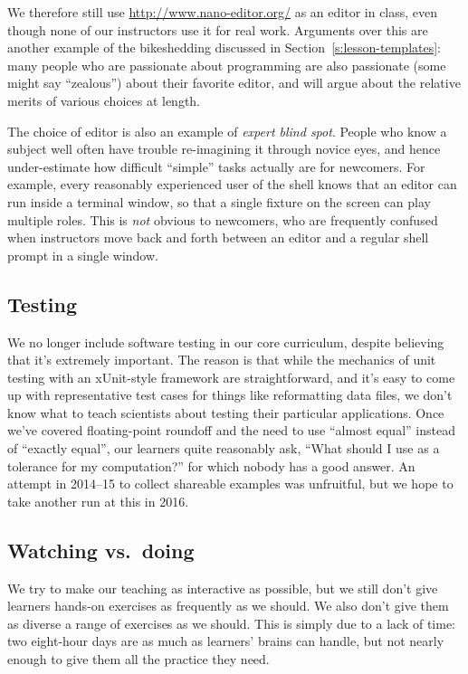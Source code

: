 \documentclass[10pt,a4paper,twocolumn]{article}
\begin{document}
We therefore still use \href{Nano}{http://www.nano-editor.org/} as an
editor in class, even though none of our instructors use it for real
work.  Arguments over this are another example of the bikeshedding
discussed in Section~\ref{s:lesson-templates}: many people who are
passionate about programming are also passionate (some might say
``zealous'') about their favorite editor, and will argue about the
relative merits of various choices at length.

The choice of editor is also an example of \emph{expert blind spot}.
People who know a subject well often have trouble re-imagining it
through novice eyes, and hence under-estimate how difficult ``simple''
tasks actually are for newcomers.  For example, every reasonably
experienced user of the shell knows that an editor can run inside a
terminal window, so that a single fixture on the screen can play
multiple roles.  This is \emph{not} obvious to newcomers, who are
frequently confused when instructors move back and forth between an
editor and a regular shell prompt in a single window.

\subsection{Testing}

We no longer include software testing in our core curriculum, despite
believing that it's extremely important.  The reason is that while the
mechanics of unit testing with an xUnit-style framework are
straightforward, and it's easy to come up with representative test
cases for things like reformatting data files, we don't know what to
teach scientists about testing their particular applications.  Once
we've covered floating-point roundoff and the need to use ``almost
equal'' instead of ``exactly equal'', our learners quite reasonably
ask, ``What should I use as a tolerance for my computation?'' for
which nobody has a good answer.  An attempt in 2014--15 to collect
shareable examples was unfruitful, but we hope to take another run at
this in 2016.

\subsection{Watching vs.\ doing}

We try to make our teaching as interactive as possible, but we still
don't give learners hands-on exercises as frequently as we should.  We
also don't give them as diverse a range of exercises as we should.
This is simply due to a lack of time: two eight-hour days are as much
as learners' brains can handle, but not nearly enough to give them all
the practice they need.
\end{document}
